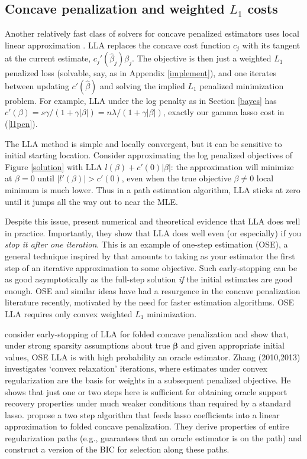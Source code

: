 \documentclass[12pt]{article}
\newcommand{\bs}[1]{\boldsymbol{#1}}
\begin{document}
\subsection{Concave penalization and weighted $L_1$ costs}
\label{lla}

Another relatively fast class of solvers for concave penalized estimators uses
local linear approximation \cite[LLA; e.g.,][]{candes_enhancing_2008}. LLA
replaces the concave cost function $c_j$  with its tangent at the current
estimate, $c_j'(\hat\beta_j)\beta_j$.  The objective is then just a weighted
$L_1$ penalized loss (solvable, say, as in Appendix \ref{implement}), and one
iterates between updating $c'(\hat\beta)$ and solving the implied $L_1$
penalized minimization problem. For example, LLA under the log penalty
 as in Section \ref{bayes} has $c'(\beta) = s \gamma / (1 + \gamma
|\beta|) = n\lambda/(1 + \gamma |\beta|)$, exactly our gamma lasso cost in
(\ref{l1pen}).


The LLA method  is simple and locally convergent, but  it can be
sensitive to initial starting location.  Consider approximating the log
penalized objectives of Figure \ref{solution} with LLA $l(\beta) +
c'(0)|\beta|$:  the approximation will minimize at $\beta=0$  until
$|l'(\beta)| > c'(0)$, even when the true objective $\beta\neq 0 $ local
minimum is much lower. Thus in a path estimation algorithm, LLA sticks at zero
until it jumps all the way out to near the MLE.

Despite this issue, \citet{zou_one-step_2008} present numerical and
theoretical evidence that  LLA does well in practice. Importantly, they
show that LLA does well even (or especially) if you {\it stop it after one
iteration}. This is an example of one-step estimation (OSE), a general
technique inspired by \cite{bickel_one-step_1975} that amounts to taking as
your estimator the first step of an iterative approximation to some objective.
Such early-stopping can be as good asymptotically as the full-step
solution {\it if} the initial estimates are good enough. OSE and similar
ideas have had a resurgence in the concave penalization literature recently,
motivated by the need for faster estimation algorithms.  OSE LLA requires only  convex weighted $L_1$ minimization.

\cite{fan_strong_2014} consider early-stopping of LLA
for folded concave penalization  and show that, under strong sparsity
assumptions about true $\bs{\beta}$ and given appropriate initial values, OSE
LLA is with high probability an oracle estimator.   Zhang (2010,2013)
\nocite{zhang_analysis_2010,zhang_multi-stage_2013} investigates  
`convex relaxation' iterations, where estimates under convex regularization
 are the basis for weights in a subsequent penalized objective.  He
shows that just one or two steps here is sufficient for obtaining oracle
support recovery properties under much weaker conditions than required by a
standard lasso.  \cite{wang_calibrating_2013} propose a two step algorithm
that feeds lasso coefficients into a linear approximation to folded concave
penalization.  They derive properties of entire regularization paths (e.g.,
guarantees that an oracle estimator is on the path) and construct a version of
the BIC for selection along these paths.
\end{document}
